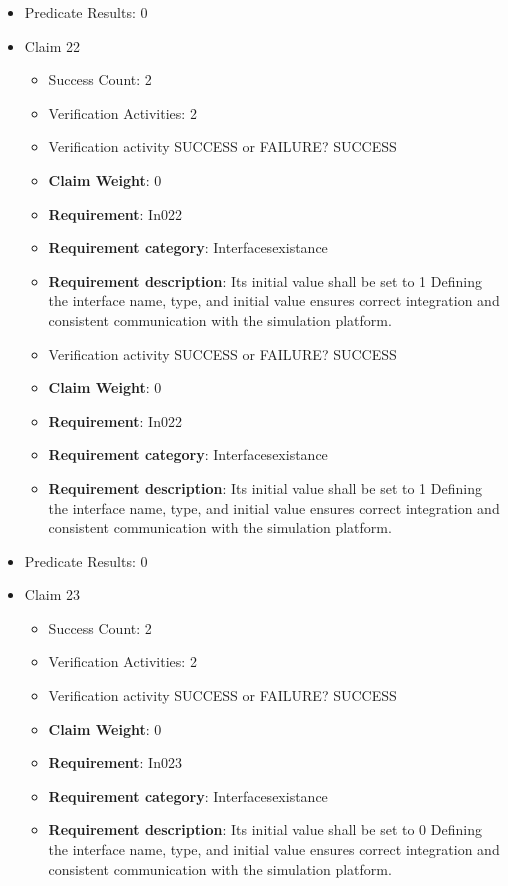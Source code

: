 \documentclass{article}
\begin{document}
\begin{itemize}
									    
				\item Predicate Results: 0

  				  \item Claim 22
				\begin{itemize}
			    	\item Success Count: 2 
			    	\item Verification Activities: 2
					\item Verification activity SUCCESS or FAILURE? SUCCESS
					\item \textbf{Claim Weight}: 0
						\item \textbf{Requirement}: In022 
						\item \textbf{Requirement category}: Interfacesexistance 
						\item \textbf{Requirement description}: Its initial value shall be set to 1 Defining the interface name, type, and initial value ensures correct integration and consistent communication with the simulation platform.
					
					\item Verification activity SUCCESS or FAILURE? SUCCESS
					\item \textbf{Claim Weight}: 0
						\item \textbf{Requirement}: In022 
						\item \textbf{Requirement category}: Interfacesexistance 
						\item \textbf{Requirement description}: Its initial value shall be set to 1 Defining the interface name, type, and initial value ensures correct integration and consistent communication with the simulation platform.
					
				\end{itemize}
				
									    
				\item Predicate Results: 0

  				  \item Claim 23
				\begin{itemize}
			    	\item Success Count: 2 
			    	\item Verification Activities: 2
					\item Verification activity SUCCESS or FAILURE? SUCCESS
					\item \textbf{Claim Weight}: 0
						\item \textbf{Requirement}: In023 
						\item \textbf{Requirement category}: Interfacesexistance 
						\item \textbf{Requirement description}: Its initial value shall be set to 0 Defining the interface name, type, and initial value ensures correct integration and consistent communication with the simulation platform.
					

\end{itemize}
\end{itemize}
\end{document}
